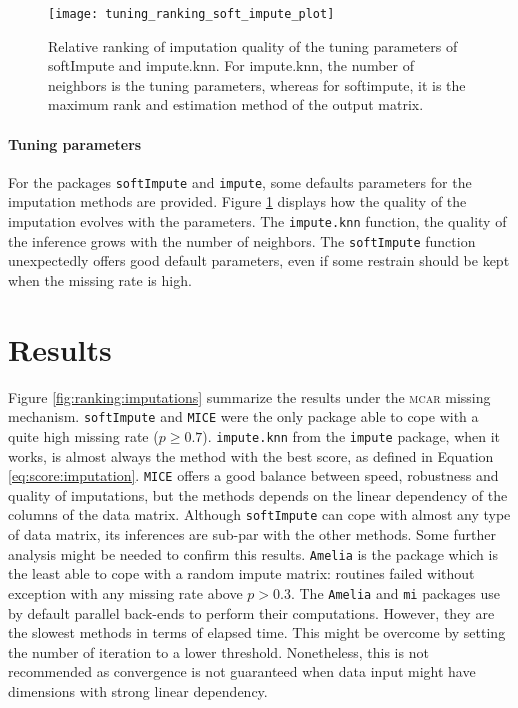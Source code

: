 \begin{figure}
  \centering
  \texttt{[image: tuning\_ranking\_soft\_impute\_plot]}
  \caption{Relative ranking of imputation quality of the tuning parameters of
    softImpute and impute.knn. For impute.knn, the number of neighbors is the
    tuning parameters, whereas for softimpute, it is the maximum rank and estimation
    method of the output matrix.}
  \label{fig:tuning:param:softimpute:imputeknn}
\end{figure}

\paragraph{Tuning parameters}
For the packages \texttt{softImpute} and \texttt{impute}, some defaults
parameters for the imputation methods are provided. Figure
\ref{fig:tuning:param:softimpute:imputeknn} displays how the quality of the
imputation evolves with the parameters. The \texttt{impute.knn} function, the
quality of the inference grows with the number of neighbors. The
\texttt{softImpute} function unexpectedly offers good default parameters, even
if some restrain should be kept when the missing rate is high.

\section{Results}

Figure \ref{fig:ranking:imputations} summarize the results under the
\textsc{mcar} missing mechanism. \texttt{softImpute} and \texttt{MICE} were the
only package able to cope with a quite high missing rate ($p \geq
0.7$). \texttt{impute.knn} from the \texttt{impute} package, when it works, is
almost always the method with the best score, as defined in Equation
\eqref{eq:score:imputation}. \texttt{MICE} offers a good balance between speed,
robustness and quality of imputations, but the methods depends on the linear
dependency of the columns of the data matrix. Although \texttt{softImpute} can
cope with almost any type of data matrix, its inferences are sub-par with the
other methods. Some further analysis might be needed to confirm this
results. \texttt{Amelia} is the package which is the least able to cope with a
random impute matrix: routines failed without exception with any missing rate
above $p > 0.3$. The \texttt{Amelia} and \texttt{mi} packages use by default
parallel back-ends to perform their computations. However, they are the slowest
methods in terms of elapsed time. This might be overcome by setting the number
of iteration to a lower threshold. Nonetheless, this is not recommended as
convergence is not guaranteed when data input might have dimensions with strong
linear dependency.


